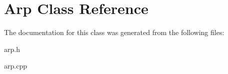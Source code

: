 \hypertarget{classArp}{}\section{Arp Class Reference}
\label{classArp}


The documentation for this class was generated from the following files\+:\begin{DoxyCompactItemize}
\item 
arp.\+h\item 
arp.\+cpp\end{DoxyCompactItemize}
